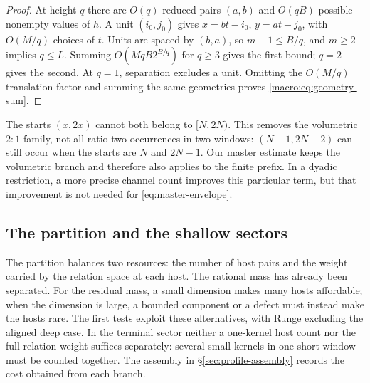 \begin{proof}
At height $q$ there are $O(q)$ reduced pairs $(a,b)$ and $O(qB)$
possible nonempty values of $h$. A unit $(i_0,j_0)$ gives
$x=bt-i_0$, $y=at-j_0$, with $O(M/q)$ choices of $t$.
Units are spaced by $(b,a)$, so $m-1\le B/q$, and $m\ge2$ implies
$q\le L$. Summing $O(MqB2^{B/q})$ for $q\ge3$ gives the first bound;
$q=2$ gives the second. At $q=1$, separation excludes a unit.
Omitting the $O(M/q)$ translation factor and summing the same geometries
proves \eqref{macro:eq:geometry-sum}.
\end{proof}
\begin{remark}\label{rem:dyadic-edge}
The starts $(x,2x)$ cannot both belong to $[N,2N)$. This removes the
volumetric $2:1$ family, not all ratio-two occurrences in two windows:
$(N-1,2N-2)$ can still occur when the starts are $N$ and $2N-1$.
Our master estimate keeps the volumetric branch and therefore also applies
to the finite prefix. In a dyadic restriction, a more precise channel count
improves this particular term, but that improvement is not needed for
\eqref{eq:master-envelope}.
\end{remark}
\subsection{The partition and the shallow sectors}

The partition balances two resources: the number of host pairs and the
weight carried by the relation space at each host. The rational mass has
already been separated. For the residual mass, a small dimension makes
many hosts affordable; when the dimension is large, a bounded component
or a defect must instead make the hosts rare. The first tests exploit
these alternatives, with Runge excluding the aligned deep case. In the
terminal sector neither a one-kernel host count nor the full relation
weight suffices separately: several small kernels in one short window
must be counted together. The assembly in \S\ref{sec:profile-assembly}
records the cost obtained from each branch.

